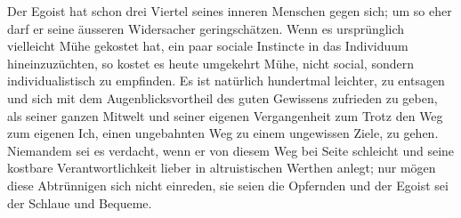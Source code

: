 Der Egoist hat schon drei Viertel seines inneren Menschen gegen sich; um so eher darf er seine äusseren Widersacher geringschätzen. Wenn es ursprünglich vielleicht Mühe gekostet hat, ein paar sociale Instincte in das Individuum hineinzuzüchten, so kostet es heute umgekehrt Mühe, nicht social, sondern individualistisch zu empfinden. Es ist natürlich hundertmal leichter, zu entsagen und sich mit dem Augenblicksvortheil des guten Gewissens zufrieden zu geben, als seiner ganzen Mitwelt und seiner eigenen Vergangenheit zum Trotz den Weg zum eigenen Ich, einen ungebahnten Weg zu einem ungewissen Ziele, zu gehen. Niemandem sei es verdacht, wenn er von diesem Weg bei Seite schleicht und seine kostbare Verantwortlichkeit lieber in altruistischen Werthen anlegt; nur mögen diese Abtrünnigen sich nicht einreden, sie seien die Opfernden und der Egoist sei der Schlaue und Bequeme.
\par

